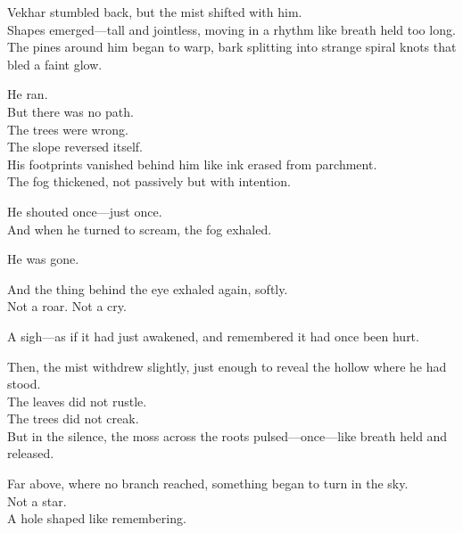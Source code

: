 \documentclass[9pt]{article}
\begin{document}
\vspace{1em}

Vekhar stumbled back, but the mist shifted with him.\\
Shapes emerged—tall and jointless, moving in a rhythm like breath held too long.\\
The pines around him began to warp, bark splitting into strange spiral knots that bled a faint glow.

\vspace{1em}

He ran.\\
But there was no path.\\
The trees were wrong.\\
The slope reversed itself.\\
His footprints vanished behind him like ink erased from parchment.\\
The fog thickened, not passively but with intention.

\vspace{1em}

He shouted once—just once.\\
And when he turned to scream, the fog exhaled.

\vspace{1em}

He was gone.

\vspace{1em}

And the thing behind the eye exhaled again, softly.\\
Not a roar. Not a cry.

\vspace{1em}

A sigh—as if it had just awakened, and remembered it had once been hurt.

\vspace{1em}

Then, the mist withdrew slightly, just enough to reveal the hollow where he had stood.\\
The leaves did not rustle.\\
The trees did not creak.\\
But in the silence, the moss across the roots pulsed—once—like breath held and released.

\vspace{1em}

Far above, where no branch reached, something began to turn in the sky.\\
Not a star.\\
A hole shaped like remembering.
\end{document}
